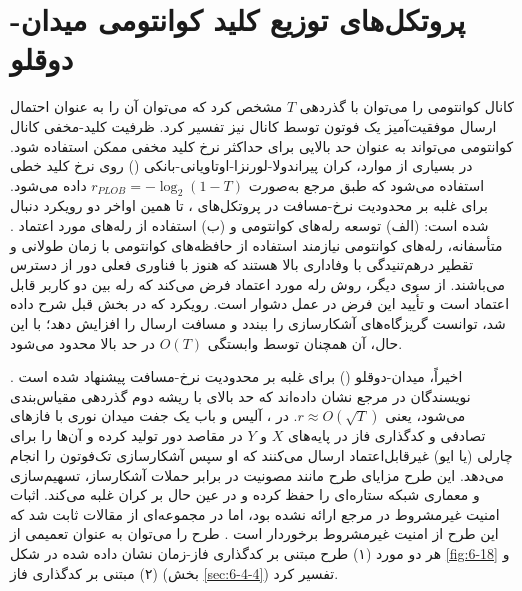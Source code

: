 \section{پروتکل‌های توزیع کلید کوانتومی میدان-دوقلو}
\label{sec:6-8}
کانال کوانتومی را می‌توان با گذردهی $T$ مشخص کرد که می‌توان آن را به عنوان احتمال ارسال موفقیت‌آمیز یک فوتون توسط کانال نیز تفسیر کرد. ظرفیت کلید-مخفی کانال کوانتومی می‌تواند به عنوان حد بالایی برای حداکثر نرخ کلید مخفی ممکن استفاده شود. در بسیاری از موارد، کران پیراندولا-لورنزا-اوتاویانی-بانکی () روی نرخ کلید خطی استفاده می‌شود که طبق مرجع \cite{97} به‌صورت $r_{PLOB} = -\log_2(1-T)$ داده می‌شود. برای غلبه بر محدودیت نرخ-مسافت در پروتکل‌های ، تا همین اواخر دو رویکرد دنبال شده است: (الف) توسعه رله‌های کوانتومی \cite{98} و (ب) استفاده از رله‌های مورد اعتماد \cite{99}. متأسفانه، رله‌های کوانتومی نیازمند استفاده از حافظه‌های کوانتومی با زمان طولانی و تقطیر درهم‌تنیدگی با وفاداری بالا هستند که هنوز با فناوری فعلی دور از دسترس می‌باشند. از سوی دیگر، روش رله مورد اعتماد فرض می‌کند که رله بین دو کاربر قابل اعتماد است و تأیید این فرض در عمل دشوار است. رویکرد  که در بخش قبل شرح داده شد، توانست گریزگاه‌های آشکارسازی را ببندد و مسافت ارسال را افزایش دهد؛ با این حال،  آن همچنان توسط وابستگی $O(T)$ در حد بالا محدود می‌شود.

اخیراً،  میدان-دوقلو () برای غلبه بر محدودیت نرخ-مسافت پیشنهاد شده است \cite{100}. نویسندگان در مرجع \cite{100} نشان داده‌اند که حد بالای  با ریشه دوم گذردهی مقیاس‌بندی می‌شود، یعنی $r \approx O(\sqrt{T})$. در ، آلیس و باب یک جفت میدان نوری با فازهای تصادفی و کدگذاری فاز در پایه‌های $X$ و $Y$ در مقاصد دور تولید کرده و آن‌ها را برای چارلی (یا ایو) غیرقابل‌اعتماد ارسال می‌کنند که او سپس آشکارسازی تک‌فوتون را انجام می‌دهد. این طرح مزایای طرح  مانند مصونیت در برابر حملات آشکارساز، تسهیم‌سازی  و معماری شبکه ستاره‌ای را حفظ کرده و در عین حال بر کران  غلبه می‌کند. اثبات امنیت غیرمشروط در مرجع \cite{100} ارائه نشده بود، اما در مجموعه‌ای از مقالات ثابت شد که این طرح از امنیت غیرمشروط برخوردار است \cite{101,102,103,104}. طرح  را می‌توان به عنوان تعمیمی از هر دو مورد (۱) طرح  مبتنی بر کدگذاری فاز-زمان نشان داده شده در شکل \ref{fig:6-18} و (۲)  مبتنی بر کدگذاری فاز (بخش \ref{sec:6-4-4}) تفسیر کرد.

